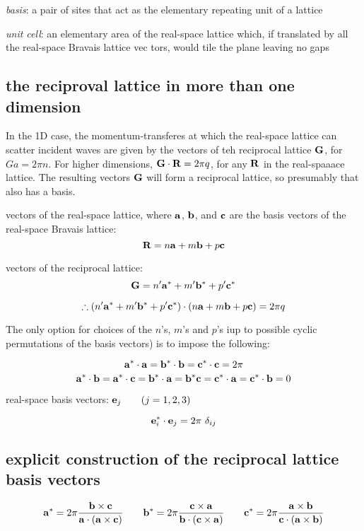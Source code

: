 \documentclass[10pt, a4paper, twocolumn]{article}
\newcommand{\deff}[1]{\par \noindent \textit{#1}: }
\begin{document}
\deff{basis} a pair of sites that act as the elementary repeating unit of a lattice

\deff{unit cell} an elementary area of the real-space lattice which, if translated by all the real-space Bravais lattice vec tors, would tile the plane leaving no gaps

\subsection{the reciproval lattice in more than one dimension}

In the 1D case, the momentum-transferes at which the real-space lattice can scatter incident waves are given by the vectors of teh reciprocal lattice $\vb G$, for $Ga=2\pi n$. For higher dimensions, $\vb G\cdot \vb R = 2\pi q$, for any $\vb R$ in the real-spaaace lattice. The resulting vectors $\vb G$ will form a reciprocal lattice, so presumably that also has a basis.

vectors of the real-space lattice, where $\vb a$, $\vb b$, and $\vb c$ are the basis vectors of the real-space Bravais lattice:
\[\vb R =n\vb a+m\vb b+p\vb c\]

vectors of the reciprocal lattice:
\[\vb G = n'\vb a^*+m'\vb b^*+p'\vb c^*\]

\[\therefore
(n'\vb a^*+m'\vb b^*+p'\vb c^*)\cdot
(n\vb a +m\vb b +p\vb c)=2\pi q\]

The only option for choices of the $n$'s, $m$'s and $p$'s iup to possible cyclic permutations of the basis vectors) is to impose the following:

\[\vb a^*\cdot \vb a =\vb b^*\cdot \vb b
=\vb c^*\cdot \vb c = 2 \pi\]
\[\vb a^* \cdot \vb b = \vb a^*\cdot \vb c
=\vb b^*\cdot \vb a = \vb b^*\vb c
=\vb c^* \cdot \vb a = \vb c^* \cdot \vb b=0\]

real-space basis vectors: $\vb e_j\qquad(j=1,2,3)$

\[\vb e _i^*\cdot \vb e _j=2\pi \ \delta _{ij}\]

\subsection{explicit construction of the reciprocal lattice basis vectors}

\[ \vb a^*=2\pi \frac{\vb b \times \vb c}
{\vb a \cdot (\vb a \times \vb c)}
\qquad \vb b^*=2\pi \frac{\vb c \times \vb a}
{\vb b \cdot (\vb c \times \vb a)}
\qquad \vb c^*=2\pi \frac{\vb a \times \vb b}
{\vb c \cdot (\vb a \times \vb b)} \]
\end{document}
